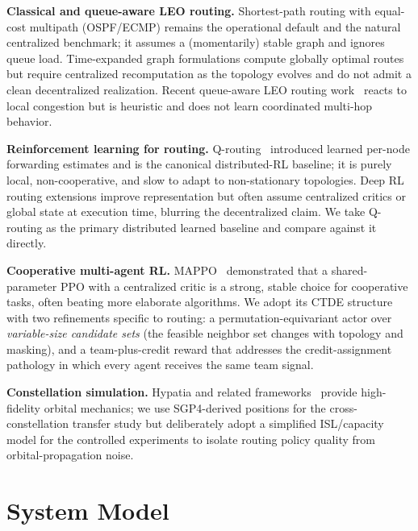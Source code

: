 \documentclass[conference,10pt]{IEEEtran}
\begin{document}
\textbf{Classical and queue-aware LEO routing.} Shortest-path routing with equal-cost multipath (OSPF/ECMP) remains the operational default and the natural centralized benchmark; it assumes a (momentarily) stable graph and ignores queue load. Time-expanded graph formulations compute globally optimal routes but require centralized recomputation as the topology evolves and do not admit a clean decentralized realization. Recent queue-aware LEO routing work~\cite{leorl2023} reacts to local congestion but is heuristic and does not learn coordinated multi-hop behavior.

\textbf{Reinforcement learning for routing.} Q-routing~\cite{boyan1994q} introduced learned per-node forwarding estimates and is the canonical distributed-RL baseline; it is purely local, non-cooperative, and slow to adapt to non-stationary topologies. Deep RL routing extensions improve representation but often assume centralized critics or global state at execution time, blurring the decentralized claim. We take Q-routing as the primary distributed learned baseline and compare against it directly.

\textbf{Cooperative multi-agent RL.} MAPPO~\cite{yu2022surprising} demonstrated that a shared-parameter PPO with a centralized critic is a strong, stable choice for cooperative tasks, often beating more elaborate algorithms. We adopt its CTDE structure with two refinements specific to routing: a permutation-equivariant actor over \emph{variable-size candidate sets} (the feasible neighbor set changes with topology and masking), and a team-plus-credit reward that addresses the credit-assignment pathology in which every agent receives the same team signal.

\textbf{Constellation simulation.} Hypatia and related frameworks~\cite{hypatia} provide high-fidelity orbital mechanics; we use SGP4-derived positions for the cross-constellation transfer study but deliberately adopt a simplified ISL/capacity model for the controlled experiments to isolate routing policy quality from orbital-propagation noise.

\section{System Model}
\label{sec:model}
\end{document}
